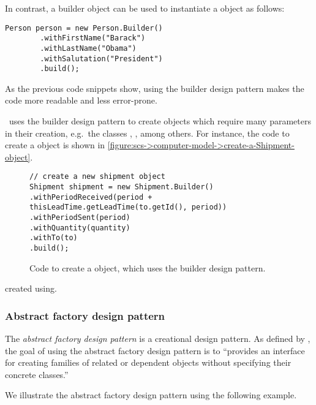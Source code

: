 In contrast, a builder object can be used
to instantiate a  object as follows:
\begin{lstlisting}
Person person = new Person.Builder()
        .withFirstName("Barack")
        .withLastName("Obama")
        .withSalutation("President")
        .build();
\end{lstlisting}

As the previous code snippets show,
using the builder design pattern makes the code more readable
and less error-prone.

\scs\ uses the builder design pattern to create objects
which require many parameters in their creation,
e.g.\ the classes , , among others.
For instance, the code to create a  object
is shown in \autoref{figure:scs->computer-model->create-a-Shipment-object}.

\begin{figure}[h!]
\begin{lstlisting}
// create a new shipment object
Shipment shipment = new Shipment.Builder()
.withPeriodReceived(period + thisLeadTime.getLeadTime(to.getId(), period))
.withPeriodSent(period)
.withQuantity(quantity)
.withTo(to)
.build();
\end{lstlisting}
\caption{Code to create a  object,
which uses the builder design pattern.}
\label{figure:scs->computer-model->create-a-Shipment-object}
\end{figure}
created using.





\subsubsection{Abstract factory design pattern}

The \emph{abstract factory design pattern} is a creational design pattern.
As defined by \cite{gang-of-four-1994},
the goal of using the abstract factory design pattern is to
``provides an interface for creating families
of related or dependent objects without specifying their concrete classes.''

We illustrate the abstract factory design pattern using the following example.

